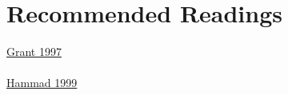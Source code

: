 \documentclass{article} %
\begin{document}
\section{Recommended Readings}

\href{https://github.com/LukasWolff2002/Lab_2_FM/blob/main/LECTURAS/Grant_1997.pdf}{Grant 1997}
\\ \\
\href{https://github.com/LukasWolff2002/Lab_2_FM/blob/main/LECTURAS/Hammad_1999.pdf}{Hammad 1999}

\end{document}
